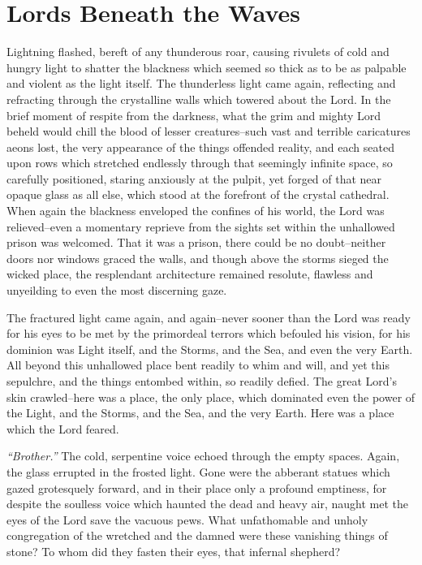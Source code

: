 \documentclass{report}
\begin{document}
\chapter*{Lords Beneath the Waves}

Lightning flashed, bereft of any thunderous roar, causing rivulets of cold and hungry light to shatter the blackness which seemed so thick as to be as palpable and violent as the light itself. The thunderless light came again, reflecting and refracting through the crystalline walls which towered about the Lord. In the brief moment of respite from the darkness, what the grim and mighty Lord beheld would chill the blood of lesser creatures--such vast and terrible caricatures aeons lost, the very appearance of the things offended reality, and each seated upon rows which stretched endlessly through that seemingly infinite space, so carefully positioned, staring anxiously at the pulpit, yet forged of that near opaque glass as all else, which stood at the forefront of the crystal cathedral. When again the blackness enveloped the confines of his world, the Lord was relieved--even a momentary reprieve from the sights set within the unhallowed prison was welcomed. That it was a prison, there could be no doubt--neither doors nor windows graced the walls, and though above the storms sieged the wicked place, the resplendant architecture remained resolute, flawless and unyeilding to even the most discerning gaze.

The fractured light came again, and again--never sooner than the Lord was ready for his eyes to be met by the primordeal terrors which befouled his vision, for his dominion was Light itself, and the Storms, and the Sea, and even the very Earth. All beyond this unhallowed place bent readily to whim and will, and yet this sepulchre, and the things entombed within, so readily defied. The great Lord's skin crawled--here was a place, the only place, which dominated even the power of the Light, and the Storms, and the Sea, and the very Earth. Here was a place which the Lord feared.

\textit{``Brother.''} The cold, serpentine voice echoed through the empty spaces. Again, the glass errupted in the frosted light. Gone were the abberant statues which gazed grotesquely forward, and in their place only a profound emptiness, for despite the soulless voice which haunted the dead and heavy air, naught met the eyes of the Lord save the vacuous pews. What unfathomable and unholy congregation of the wretched and the damned were these vanishing things of stone? To whom did they fasten their eyes, that infernal shepherd?
\end{document}
